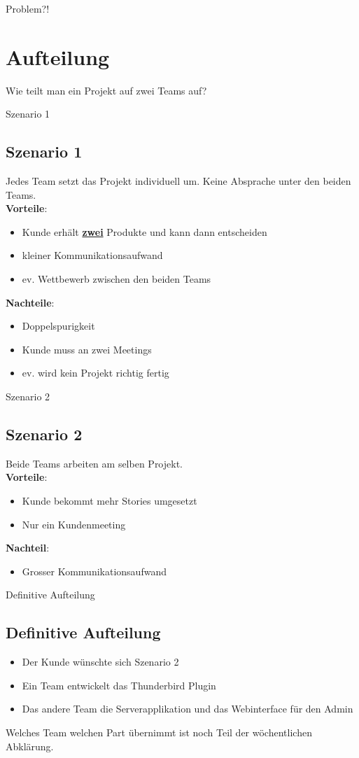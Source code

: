 \documentclass{beamer}
\begin{document}
\begin{frame}{Problem?!}
\section{Aufteilung}
Wie teilt man ein Projekt auf zwei Teams auf?
\end{frame}
\begin{frame}{Szenario 1}
\subsection{Szenario 1}
Jedes Team setzt das Projekt individuell um. Keine Absprache unter den beiden
Teams.\\ \bigbreak
\textbf{Vorteile}:
\begin{itemize}
 \item Kunde erhält \textbf{\underline{zwei}} Produkte und kann dann
entscheiden
 \item kleiner Kommunikationsaufwand
 \item ev. Wettbewerb zwischen den beiden Teams
\end{itemize} \bigbreak
\textbf{Nachteile}: 
\begin{itemize}
 \item Doppelspurigkeit
 \item Kunde muss an zwei Meetings
 \item ev. wird kein Projekt richtig fertig
\end{itemize}
\end{frame}
\begin{frame}{Szenario 2}
\subsection{Szenario 2}
Beide Teams arbeiten am selben Projekt.\\ \bigbreak
\textbf{Vorteile}:
\begin{itemize}
 \item Kunde bekommt mehr Stories umgesetzt
 \item Nur ein Kundenmeeting
\end{itemize} \bigbreak
\textbf{Nachteil}:
\begin{itemize}
 \item Grosser Kommunikationsaufwand
\end{itemize}
\end{frame}
\begin{frame}{Definitive Aufteilung}
\subsection{Definitive Aufteilung}
\begin{itemize}
 \item Der Kunde wünschte sich Szenario 2
 \item Ein Team entwickelt das Thunderbird Plugin
 \item Das andere Team die Serverapplikation und das Webinterface für den Admin
\end{itemize}
Welches Team welchen Part übernimmt ist noch Teil der wöchentlichen Abklärung.
\end{frame}
\end{document}
